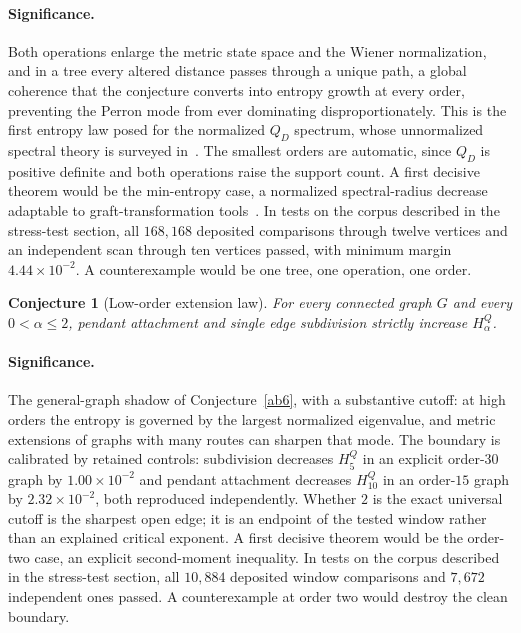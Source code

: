 \documentclass[11pt]{article}
\newtheorem{conjecture}{Conjecture}
\theoremstyle{definition}
\begin{document}
\paragraph{Significance.}
Both operations enlarge the metric state space and the Wiener normalization, and in a tree every altered distance passes through a unique path, a global coherence that the conjecture converts into entropy growth at every order, preventing the Perron mode from ever dominating disproportionately.  This is the first entropy law posed for the normalized $Q_D$ spectrum, whose unnormalized spectral theory is surveyed in~\cite{RGW26}.  The smallest orders are automatic, since $Q_D$ is positive definite and both operations raise the support count.  A first decisive theorem would be the min-entropy case, a normalized spectral-radius decrease adaptable to graft-transformation tools~\cite{FW19}.  In tests on the corpus described in the stress-test section, all $168{,}168$ deposited comparisons through twelve vertices and an independent scan through ten vertices passed, with minimum margin $4.44\times10^{-2}$.  A counterexample would be one tree, one operation, one order.

\begin{conjecture}[Low-order extension law]\label{ab7}
For every connected graph $G$ and every $0<\alpha\le2$, pendant attachment and single edge subdivision strictly increase $H^Q_\alpha$.
\end{conjecture}

\paragraph{Significance.}
The general-graph shadow of Conjecture~\ref{ab6}, with a substantive cutoff: at high orders the entropy is governed by the largest normalized eigenvalue, and metric extensions of graphs with many routes can sharpen that mode.  The boundary is calibrated by retained controls: subdivision decreases $H^Q_5$ in an explicit order-$30$ graph by $1.00\times10^{-2}$ and pendant attachment decreases $H^Q_{10}$ in an order-$15$ graph by $2.32\times10^{-2}$, both reproduced independently.  Whether $2$ is the exact universal cutoff is the sharpest open edge; it is an endpoint of the tested window rather than an explained critical exponent.  A first decisive theorem would be the order-two case, an explicit second-moment inequality.  In tests on the corpus described in the stress-test section, all $10{,}884$ deposited window comparisons and $7{,}672$ independent ones passed.  A counterexample at order two would destroy the clean boundary.
\end{document}
